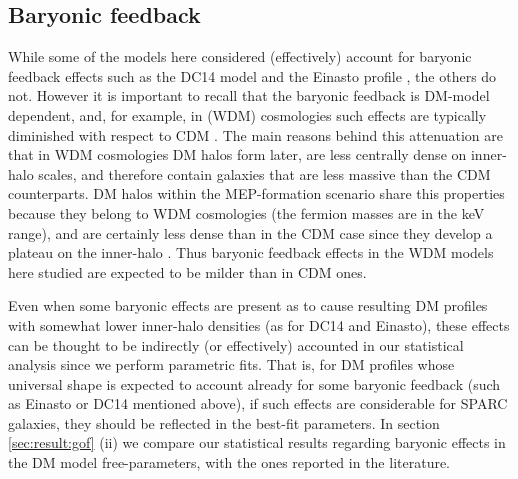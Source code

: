 \subsection{Baryonic feedback}
\label{sec:baryonic-effect}

While some of the models here considered (effectively) account for baryonic feedback effects such as the DC14 model \citep{2014MNRAS.441.2986D} and the Einasto profile \citep{2019MNRAS.483.4086B}, the others do not. However it is important to recall that the baryonic feedback is DM-model dependent, and, for example, in  (WDM) cosmologies such effects are typically diminished with respect to CDM \citep{2019MNRAS.483.4086B}. The main reasons behind this attenuation are that in WDM cosmologies DM halos form later, are less centrally dense on inner-halo scales, and therefore contain galaxies that are less massive than the CDM counterparts. DM halos within the MEP-formation scenario share this properties because they belong to WDM cosmologies (the fermion masses are in the keV range), and are certainly less dense than in the CDM case since they develop a plateau on the inner-halo \citep{2021MNRAS.502.4227A}. Thus baryonic feedback effects in the WDM models here studied are expected to be milder than in CDM ones.
    
Even when some baryonic effects are present as to cause resulting DM profiles with somewhat lower inner-halo densities (as for DC14 and Einasto), these effects can be thought to be indirectly (or effectively) accounted in our statistical analysis since we perform parametric fits. That is, for DM profiles whose universal shape is expected to account already for some baryonic feedback (such as Einasto or DC14 mentioned above), if such effects are considerable for SPARC galaxies, they should be reflected in the best-fit parameters. In section \ref{sec:result:gof} (ii) we compare our statistical results regarding baryonic effects in the DM model free-parameters, with the ones reported in the literature.


